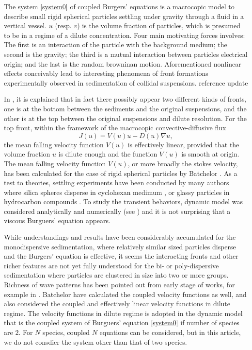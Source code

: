 \documentclass{amsart}
\def\blue{\color{blue}}
\theoremstyle{definition}
\numberwithin{equation}{section}
\begin{document}
The system \eqref{system0} of coupled Burgers' equations is a macrocopic model to describe small rigid spherical particles settling under gravity through a fluid in a vertical vessel. $u$ (resp. $v$) is the volume fraction of particles, which is presumed to be in a regime of a dilute concentration. Four main motivating forces involves: The first is an interaction of the particle with the background medium; the second is the gravity; the third is a mutual interaction between particles electrical origin; and the last is the random browninan motion. Aforementioned nonlinear effects conceivably lead to interesting phenomena of front formations experimentally observed  in sedimentation of collidal suspensions. {\blue reference update} 

In \cite{esipov_1995}, it is explained that in fact there possibly appear two different kinds of fronts, one is at the bottom between the sediments and the original suspensions, and the other is at the top between the original suspensions and dilute resolution. For the top front, within the framework of the macrocopic convective-diffusive flux 
\begin{equation} \label{flux}
 J(u) = V(u)u - D(u)\nabla u,
\end{equation}
the mean falling velocity function $V(u)$ is effectively linear, provided that the volume fraction $u$ is dilute enough and the function $V(u)$ is smooth at origin. The mean falling velocity function $V(u)$, or more broadly the stokes velocity, has been calculated for the case of rigid spherical particles by Batchelor \cite{B1982_1, B1982_2}. As a test to theories, settling experiments have been conducted by many authors where silica spheres disperse in cyclohexan medimum \cite{AS1993}, or glassy particles in hydrocarbon compounds \cite{DB1988}. To study the transient behaviors, dynamic model was considered analytically and numerically (see \cite{BG1987}) and it is not surprising that a viscous Burguers' equation appears. 

While understandings and results have been considerably accumulated for the monodispersive sedimentation, where relatively similar sized particles disperse and the Burgers' equation is effective, it seems the interacting fronts and other richer features are not yet fully understood for the bi- or poly-dispersive sedimentation where particles are clustered in size into two or more groups. Richness of wave patterns has been pointed out from early stage of works, for example in \cite[Fig 3]{esipov_1995}. Batchelor \cite{B1982_1} have calculated the coupled velocity functions as well, and also considered the coupled and effectively linear velocity functions in dilute regime. The velocity functions in dilute regime  is adopted in the dynamic model \cite[eq. 3.2]{esipov_1995} that is the coupled system of Burguers' equation \eqref{system0} if number of species are $2$. For $N$ species, coupled $N$ equations can be considered, but in this article, we do not consdier the system other than that of two species. %
\end{document}
